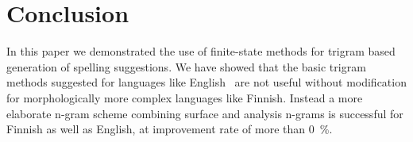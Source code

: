 \documentclass[11pt,a4paper]{article}
\begin{document}
\section{Conclusion}

In this paper we demonstrated the use of finite-state methods for trigram based
generation of spelling suggestions. We have showed that the basic trigram
methods suggested for languages like English~\cite{wilcox-ohearn/2008} are not
useful without modification for morphologically more complex languages like
Finnish.  Instead a more elaborate n-gram scheme combining surface and analysis
n-grams is successful for Finnish as well as English, at improvement rate of
more than 0~\%.





\end{document}
